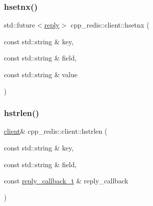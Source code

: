 \mbox{\label{classcpp__redis_1_1client_a72b5a16cc761f51e9986bcfcf644e999}} 
\subsubsection{\texorpdfstring{hsetnx()}{hsetnx()}\hspace{0.1cm}{\footnotesize\ttfamily [2/2]}}
{\footnotesize\ttfamily std\+::future$<$\hyperlink{classcpp__redis_1_1reply}{reply}$>$ cpp\+\_\+redis\+::client\+::hsetnx (\begin{DoxyParamCaption}\item[{const std\+::string \&}]{key,  }\item[{const std\+::string \&}]{field,  }\item[{const std\+::string \&}]{value }\end{DoxyParamCaption})}

\mbox{\label{classcpp__redis_1_1client_a5e1543cd782d3ff9d17de5e200fd038a}} 
\subsubsection{\texorpdfstring{hstrlen()}{hstrlen()}\hspace{0.1cm}{\footnotesize\ttfamily [1/2]}}
{\footnotesize\ttfamily \hyperlink{classcpp__redis_1_1client}{client}\& cpp\+\_\+redis\+::client\+::hstrlen (\begin{DoxyParamCaption}\item[{const std\+::string \&}]{key,  }\item[{const std\+::string \&}]{field,  }\item[{const \hyperlink{classcpp__redis_1_1client_a061a1140d36d2eaeda82b09a0bb3f9f2}{reply\+\_\+callback\+\_\+t} \&}]{reply\+\_\+callback }\end{DoxyParamCaption})}

\mbox{\label{classcpp__redis_1_1client_a612c5f64a9fec6c8c2df8b113173146a}} 
